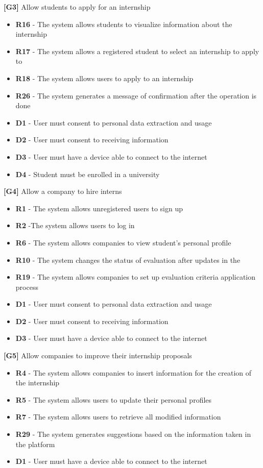 \textbf{[G3]} Allow students to apply for an internship
\begin{itemize}
    \item \textbf{R16} - The system allows students to visualize information about the internship
    \item \textbf{R17} - The system allows a registered student to select an internship to apply to
    \item \textbf{R18} - The system allows users to apply to an internship
    \item \textbf{R26} - The system generates a message of confirmation after the operation is done
    \item \textbf{D1} - User must consent to personal data extraction and usage
    \item \textbf{D2} - User must consent to receiving information
    \item \textbf{D3} - User must have a device able to connect to the internet
    \item \textbf{D4} - Student must be enrolled in a university
\end{itemize}

\textbf{[G4]} Allow a company to hire interns
\begin{itemize}
    \item \textbf{R1} - The system allows unregistered users to sign up
    \item \textbf{R2} -The system allows users to log in
    \item \textbf{R6} - The system allows companies to view student's personal profile
    \item \textbf{R10} - The system changes the status of evaluation after updates in the
    \item \textbf{R19} - The system allows companies to set up evaluation criteria application process
    \item \textbf{D1} - User must consent to personal data extraction and usage
    \item \textbf{D2} - User must consent to receiving information
    \item \textbf{D3} - User must have a device able to connect to the internet
\end{itemize}

\textbf{[G5]} Allow companies to improve their internship proposals
\begin{itemize}
    \item \textbf{R4} - The system allows companies to insert information for the creation of the internship
    \item \textbf{R5} - The system allows users to update their personal profiles
    \item \textbf{R7} - The system allows users to retrieve all modified information
    \item \textbf{R29} - The system generates suggestions based on the information taken in the platform
    \item \textbf{D1} - User must have a device able to connect to the internet
\end{itemize}


